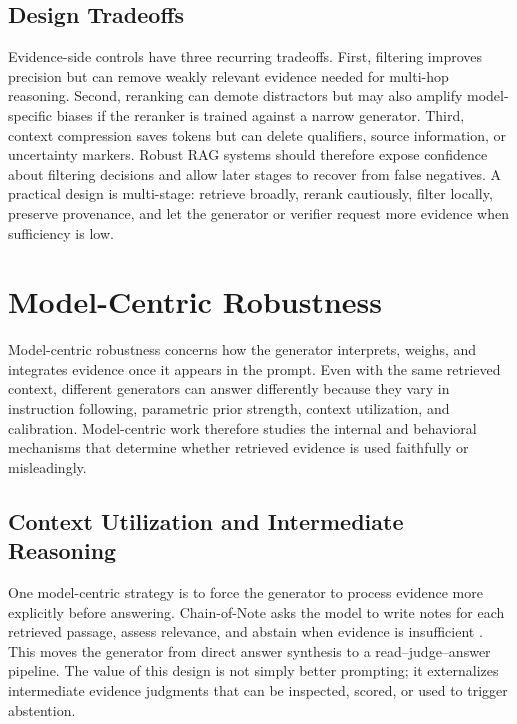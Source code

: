 \documentclass[11pt]{article}
\begin{document}
\subsection{Design Tradeoffs}

Evidence-side controls have three recurring tradeoffs. First, filtering improves precision but can remove weakly relevant evidence needed for multi-hop reasoning. Second, reranking can demote distractors but may also amplify model-specific biases if the reranker is trained against a narrow generator. Third, context compression saves tokens but can delete qualifiers, source information, or uncertainty markers. Robust RAG systems should therefore expose confidence about filtering decisions and allow later stages to recover from false negatives. A practical design is multi-stage: retrieve broadly, rerank cautiously, filter locally, preserve provenance, and let the generator or verifier request more evidence when sufficiency is low.

\section{Model-Centric Robustness}
\label{sec:model}

Model-centric robustness concerns how the generator interprets, weighs, and integrates evidence once it appears in the prompt. Even with the same retrieved context, different generators can answer differently because they vary in instruction following, parametric prior strength, context utilization, and calibration. Model-centric work therefore studies the internal and behavioral mechanisms that determine whether retrieved evidence is used faithfully or misleadingly.



\subsection{Context Utilization and Intermediate Reasoning}

One model-centric strategy is to force the generator to process evidence more explicitly before answering. Chain-of-Note asks the model to write notes for each retrieved passage, assess relevance, and abstain when evidence is insufficient \citep{chainOfNote2023}. This moves the generator from direct answer synthesis to a read--judge--answer pipeline. The value of this design is not simply better prompting; it externalizes intermediate evidence judgments that can be inspected, scored, or used to trigger abstention.
\end{document}
